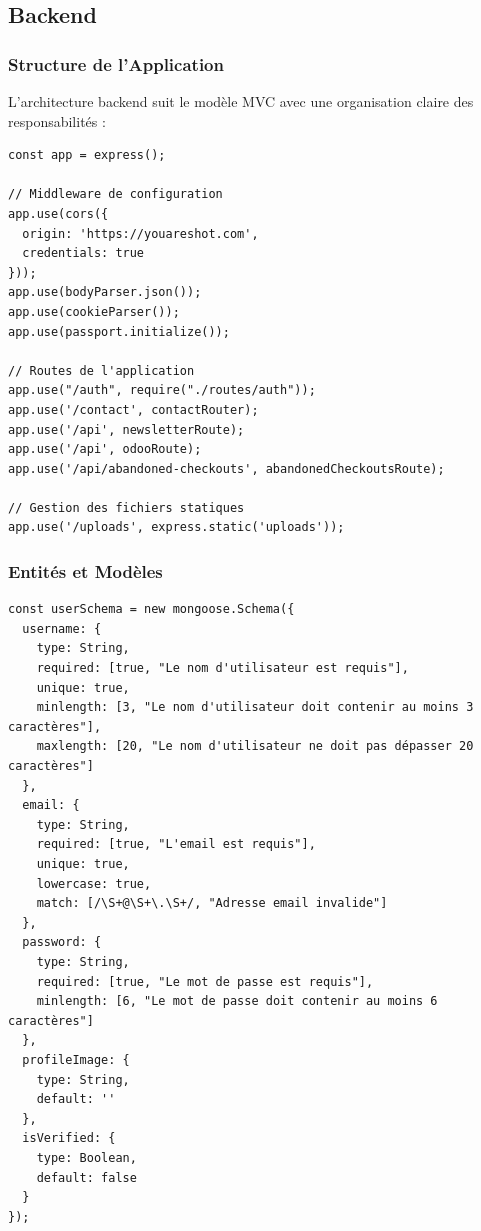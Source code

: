 \documentclass[12pt,a4paper]{article}
\begin{document}
\subsection{Backend}

\subsubsection{Structure de l'Application}
L'architecture backend suit le modèle MVC avec une organisation claire des responsabilités :

\begin{lstlisting}[caption=Structure du serveur Express]
const app = express();

// Middleware de configuration
app.use(cors({
  origin: 'https://youareshot.com',
  credentials: true
}));
app.use(bodyParser.json());
app.use(cookieParser());
app.use(passport.initialize());

// Routes de l'application
app.use("/auth", require("./routes/auth"));
app.use('/contact', contactRouter);
app.use('/api', newsletterRoute);
app.use('/api', odooRoute);
app.use('/api/abandoned-checkouts', abandonedCheckoutsRoute);

// Gestion des fichiers statiques
app.use('/uploads', express.static('uploads'));
\end{lstlisting}

\subsubsection{Entités et Modèles}
\begin{lstlisting}[caption=Modèle User avec Mongoose]
const userSchema = new mongoose.Schema({
  username: {
    type: String,
    required: [true, "Le nom d'utilisateur est requis"],
    unique: true,
    minlength: [3, "Le nom d'utilisateur doit contenir au moins 3 caractères"],
    maxlength: [20, "Le nom d'utilisateur ne doit pas dépasser 20 caractères"]
  },
  email: {
    type: String,
    required: [true, "L'email est requis"],
    unique: true,
    lowercase: true,
    match: [/\S+@\S+\.\S+/, "Adresse email invalide"]
  },
  password: {
    type: String,
    required: [true, "Le mot de passe est requis"],
    minlength: [6, "Le mot de passe doit contenir au moins 6 caractères"]
  },
  profileImage: {
    type: String,
    default: ''
  },
  isVerified: {
    type: Boolean,
    default: false
  }
});
\end{lstlisting}
\end{document}
